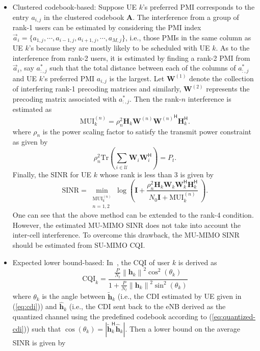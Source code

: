 \documentclass[a4paper,12pt]{article}%
\newcommand{\norm}[1]{\left\lVert#1\right\rVert} %
\begin{document}
\begin{itemize}
\item  Clustered codebook-based:  Suppose UE $k$'s preferred PMI corresponds to the entry $a_{i,j}$ in the clustered codebook $\mathbf{A}$. The interference from a group of rank-1 users can be estimated by considering the PMI index $\vec{a}_i =\{a_{1,j},\cdots,a_{i-1,j},a_{i+1,j},\cdots,a_{M,j}\}$, i.e., those PMIs in the same column as UE $k$'s because they are mostly likely to be scheduled with UE $k$. As to the interference from rank-2 users, it is estimated by finding a rank-2 PMI from $\vec{a}_i$, say $a^*_{:,j}$ such that the total distance between each of the columns of $a^*_{:,j}$ and UE $k$'s preferred PMI $a_{i,j}$ is the largest. Let $\mathbf{W}^{(1)}$ denote the collection of interfering rank-1 precoding matrices and similarly, $\mathbf{W}^{(2)}$ represents the precoding matrix associated with $a^*_{:,j}$. Then the rank-$n$ interference is estimated as
\begin{equation}
\text{MUI}_k^{(n)} = \rho_n^2 \mathbf{H}_k \mathbf{W}^{(n)} {\mathbf{W}^{(n)}}^\mathsf{H} \mathbf{H}_k^\mathsf{H}.
\end{equation}
where $\rho_n$ is the power scaling factor to satisfy the transmit power constraint as given by
\begin{equation}
\rho_n^2 \text{Tr}\left( \sum_{i \in \mathcal{U} } \mathbf{W}_{i} \mathbf{W}_i^\mathsf{H} \right) = P_t.
\end{equation}
Finally, the SINR for UE $k$ whose rank is less than 3 is given by
\begin{equation}
\text{SINR}=\min_{\substack{\text{MUI}_k^{(n)} \\ n=1,2}} \log\left( \mathbf{I}+  \frac{ \rho_n^2 \mathbf{H}_k \mathbf{W}_k \mathbf{W}_k^\mathsf{H} \mathbf{H}_k^{\mathsf{H}} }{ N_0 \mathbf{I} + \text{MUI}_k^{(n)} }\ \right).
\end{equation}
One can see that the above method can be extended to the rank-4 condition. However, the estimated MU-MIMO SINR does not take into account the inter-cell interference. To overcome this drawback, the MU-MIMO SINR should be estimated from SU-MIMO CQI.
%
\item Expected lower bound-based: In~\cite{R1-062483}, the CQI of user $k$ is derived as
\begin{equation}
\text{CQI}_k = \frac{ \frac{P}{N_t} \norm{\mathbf{h}_k}^2 \cos^2(\theta_k) }{ 1 + \frac{P}{N_t} \norm{\mathbf{h}_k}^2 \sin^2(\theta_k) }
\end{equation}
where $\theta_k$ is the angle between $\tilde{\mathbf{h}}_k$ (i.e., the CDI estimated by UE given in (\ref{eq:cdi})) and $\hat{\mathbf{h}}_k$ (i.e., the CDI sent back to the eNB derived as the quantized channel using the predefined codebook according to (\ref{eq:quantized-cdi})) such that $\cos(\theta_k)=|\tilde{\mathbf{h}}_k^\mathsf{H} \hat{\mathbf{h}}_k |$. Then a lower bound on the average SINR is given by

\end{itemize}
\end{document}
